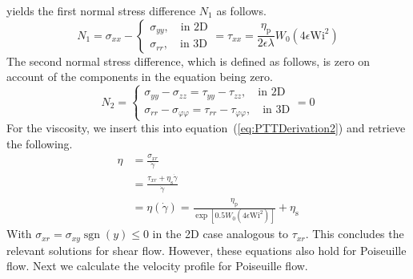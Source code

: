 \documentclass[a4paper,12pt]{scrartcl}
\newcommand{\RK}[1]{{\color{cyan}RK: #1}}
\DeclareMathOperator{\sgn}{sgn}
\begin{document}
yields the first normal stress difference $N_1$ as follows.
\begin{equation}
	N_1 = \sigma_{xx} - \begin{cases}
		\sigma_{yy},\quad\text{in 2D} \\
		\sigma_{rr},\quad\text{in 3D}
	\end{cases} = \tau_{xx} = \frac{\eta_\text{p}}{2\epsilon\lambda}W_0\left(4\epsilon\mathrm{Wi}^2\right) %
\end{equation}
The second normal stress difference, which is defined as follows, is zero on account of the components in the equation being zero.
\begin{equation}
	N_2 = \begin{cases}
		\sigma_{yy} - \sigma_{zz} = \tau_{yy} - \tau_{zz},\quad\text{in 2D} \\
		\sigma_{rr} - \sigma_{\varphi\varphi} = \tau_{rr} - \tau_{\varphi\varphi},\quad\text{in 3D}
	\end{cases} = 0
\end{equation}
For the viscosity, we insert this into equation~(\ref{eq:PTTDerivation2}) and retrieve the following.
\begin{align}
	\eta &= \frac{\sigma_{xr}}{\dot{\gamma}} \\
	&= \frac{\tau_{xr} + \eta_\text{s}\dot{\gamma}}{\dot{\gamma}} \\
	&= \eta\left(\dot{\gamma}\right) = \frac{\eta_\text{p}}{\exp\left[0.5W_0\left(4\epsilon \mathrm{Wi}^2\right)\right]} + \eta_\text{s} %
\end{align}
With $\sigma_{xr} = \sigma_{xy}\sgn\left(y\right) \leq 0$ in the 2D case analogous to $\tau_{xr}$.
This concludes the relevant solutions for shear flow. However, these equations also hold for Poiseuille flow. Next we calculate the velocity profile for Poiseuille flow.
\end{document}
